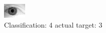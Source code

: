 \begin{figure}[h!]
\begin{center}
\includegraphics[width=0.60\columnwidth]{figures/ID2075_class_4_target_3.png}
\end{center}
\caption{ Classification: 4 actual target: 3}
\label{fig:ID2075_class_4_target_3}
\end{figure}
